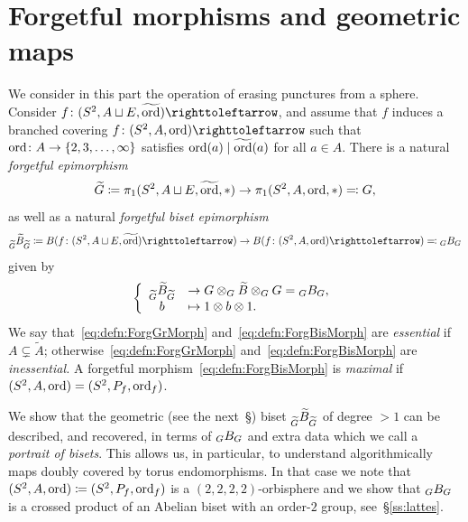 \documentclass{amsart}
\begin{document}
\section{Forgetful morphisms and geometric maps~\cite{bartholdi-dudko:bc3}}\label{ss:forgetful}
We consider in this part the operation of erasing punctures from a
sphere. Consider $f\colon(S^2, A\sqcup E,\widetilde \ord)\selfmap$,
and assume that $f$ induces a branched covering $f\colon(S^2,A,\ord)\selfmap$
such that $\operatorname{ord} \colon A\to\{2,3,\dots,\infty\}$ satisfies
$\operatorname{ord}(a)\mid \widetilde {\operatorname{ord}}(a)$ for all $a\in A$. There is a natural
\emph{forgetful epimorphism}
\begin{equation}
\label{eq:defn:ForgGrMorph}\widetilde G\coloneqq\pi_1(S^2, A\sqcup E,  \widetilde  {\operatorname{ord}},*)\to\pi_1(S^2,A,\operatorname{ord}, *)\eqqcolon G,
\end{equation}
as well as a natural \emph{forgetful biset epimorphism} 
\begin{equation}
\label{eq:defn:ForgBisMorph}
\subscript{\widetilde G}{\widetilde B}_{\widetilde G} \coloneqq B(f\colon(S^2, A\sqcup E,\widetilde  \ord)\selfmap )\to B(f\colon(S^2, A,  \ord)\selfmap)\eqqcolon \subscript {G}B_{G}
\end{equation}
given by 
\begin{equation}\label{eq:defn:ForgBisMorph2}
  \left\{\begin{array}{cl}
  \subscript{\widetilde G}{\widetilde B}_{\widetilde G} &\to G\otimes_G\widetilde B\otimes_{ G} G=\subscript G B_G,\\
  b &\mapsto 1\otimes b\otimes 1.
\end{array}\right.
\end{equation}  
We say that~\eqref{eq:defn:ForgGrMorph}
and~\eqref{eq:defn:ForgBisMorph} are \emph{essential} if $A\subsetneq
\widetilde A$; otherwise~\eqref{eq:defn:ForgGrMorph}
and~\eqref{eq:defn:ForgBisMorph} are \emph{inessential.}  A
forgetful morphism~\eqref{eq:defn:ForgBisMorph} is \emph{maximal} if
$(S^2,A,\operatorname{ord})=(S^2,P_f,\operatorname{ord}_f)$.

We show that the geometric (see the next~\S) biset
$\subscript{\widetilde G}{\widetilde B}_{\widetilde G}$ of degree $>1$
can be described, and recovered, in terms of $\subscript GB_G$ and
extra data which we call a \emph{portrait of bisets}. This allows us,
in particular, to understand algorithmically maps doubly covered by
torus endomorphisms. In that case we note that
$(S^2, A,\operatorname{ord})\coloneqq (S^2,P_f,\operatorname{ord}_f)$ is a $(2,2,2,2)$-orbisphere
and we show that $\subscript GB_G$ is a crossed product of an Abelian
biset with an order-$2$ group, see~\S\ref{ss:lattes}.
\end{document}
